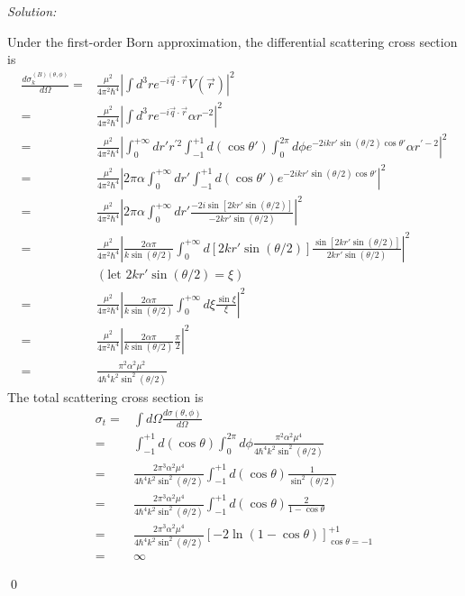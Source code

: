 \documentclass[10pt,a4paper]{article}
\newenvironment{sol}
    {\emph{Solution:}
    }
    {
    \qed
    }
\begin{document}
\begin{sol}
Under the first-order Born approximation, the differential scattering cross section is
\begin{align}
\nonumber\frac{d\sigma_k^{(B)(\theta,\phi)}}{d\Omega}=&\frac{\mu^2}{4\pi^2\hbar^4}\left|\int d^3re^{-i\vec{q}\cdot\vec{r}}V(\vec{r})\right|^2\\
\nonumber=&\frac{\mu^2}{4\pi^2\hbar^4}\left|\int d^3re^{-i\vec{q}\cdot\vec{r}}\alpha r^{-2}\right|^2\\
\nonumber=&\frac{\mu^2}{4\pi^2\hbar^4}\left|\int_0^{+\infty}dr'r^{'2}\int_{-1}^{+1}d(\cos\theta')\int_0^{2\pi}d\phi e^{-2ikr'\sin(\theta/2)\cos\theta'}\alpha r^{'-2}\right|^2\\
\nonumber=&\frac{\mu^2}{4\pi^2\hbar^4}\left|2\pi\alpha\int_0^{+\infty}dr'\int_{-1}^{+1}d(\cos\theta')e^{-2ikr'\sin(\theta/2)\cos\theta'}\right|^2\\
\nonumber=&\frac{\mu^2}{4\pi^2\hbar^4}\left|2\pi\alpha\int_0^{+\infty}dr'\frac{-2i\sin[2kr'\sin(\theta/2)]}{-2kr'\sin(\theta/2)}\right|^2\\
\nonumber=&\frac{\mu^2}{4\pi^2\hbar^4}\left|\frac{2\alpha\pi}{k\sin(\theta/2)}\int_0^{+\infty}d[2kr'\sin(\theta/2)]\frac{\sin[2kr'\sin(\theta/2)]}{2kr'\sin(\theta/2)}\right|^2\\
\nonumber&(\text{let }2kr'\sin(\theta/2)=\xi)\\
\nonumber=&\frac{\mu^2}{4\pi^2\hbar^4}\left|\frac{2\alpha\pi}{k\sin(\theta/2)}\int_0^{+\infty}d\xi\frac{\sin\xi}{\xi}\right|^2\\
\nonumber=&\frac{\mu^2}{4\pi^2\hbar^4}\left|\frac{2\alpha\pi}{k\sin(\theta/2)}\frac{\pi}{2}\right|^2\\
=&\frac{\pi^2\alpha^2\mu^2}{4\hbar^4k^2\sin^2(\theta/2)}
\end{align}
The total scattering cross section is
\begin{align}
\nonumber\sigma_t=&\int d\Omega\frac{d\sigma(\theta,\phi)}{d\Omega}\\
\nonumber=&\int_{-1}^{+1}d(\cos\theta)\int_0^{2\pi}d\phi\frac{\pi^2\alpha^2\mu^4}{4\hbar^4k^2\sin^2(\theta/2)}\\
\nonumber=&\frac{2\pi^3\alpha^2\mu^4}{4\hbar^4k^2\sin^2(\theta/2)}\int_{-1}^{+1}d(\cos\theta)\frac{1}{\sin^2(\theta/2)}\\
\nonumber=&\frac{2\pi^3\alpha^2\mu^4}{4\hbar^4k^2\sin^2(\theta/2)}\int_{-1}^{+1}d(\cos\theta)\frac{2}{1-\cos\theta}\\
\nonumber=&\frac{2\pi^3\alpha^2\mu^4}{4\hbar^4k^2\sin^2(\theta/2)}\left[-2\ln(1-\cos\theta)\right]_{\cos\theta=-1}^{+1}\\
=&\infty
\end{align}
\end{sol}
\end{document}

